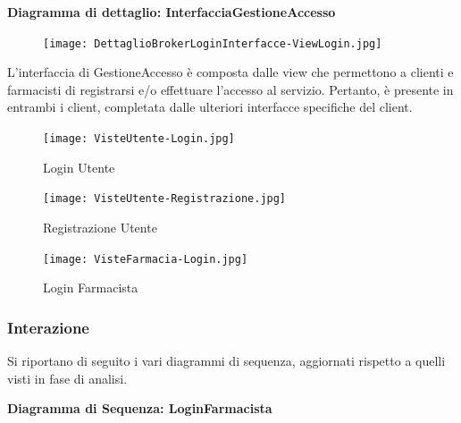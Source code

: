 \textbf{Diagramma di dettaglio: InterfacciaGestioneAccesso}
\begin{figure}[h!]
    \begin{center}
        \texttt{[image: DettaglioBrokerLoginInterfacce-ViewLogin.jpg]}
    \end{center}
\end{figure}

L'interfaccia di GestioneAccesso è composta dalle view che permettono a clienti e farmacisti di registrarsi e/o effettuare l'accesso al servizio.
Pertanto, è presente in entrambi i client, completata dalle ulteriori interfacce specifiche del client.
\\

\begin{figure}[h!]
    \centering
    \texttt{[image: VisteUtente-Login.jpg]}
    \caption{Login Utente}
\end{figure}

\begin{figure}[h!]
    \centering
    \texttt{[image: VisteUtente-Registrazione.jpg]}
    \caption{Registrazione Utente}
\end{figure}
\newpage

\begin{figure}[h!]
    \centering
    \texttt{[image: VisteFarmacia-Login.jpg]}
    \caption{Login Farmacista}
\end{figure}
\newpage

\subsubsection{Interazione}

Si riportano di seguito i vari diagrammi di sequenza, aggiornati rispetto a quelli visti in fase di analisi.

\vspace{3em}

\textbf{Diagramma di Sequenza: LoginFarmacista}

